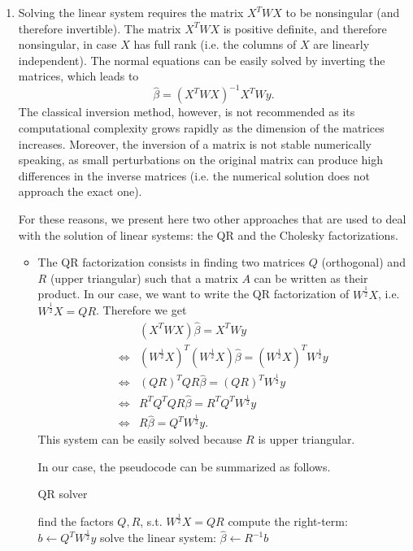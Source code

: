 \documentclass{homework}
\begin{document}
\begin{enumerate}[label=(\Alph*)]
\item Solving the linear system requires the matrix $X^T W X$ to be nonsingular (and therefore invertible). The matrix $X^T W X$ is positive definite, and therefore nonsingular, in case $X$ has full rank (i.e. the columns of $X$ are linearly independent). The normal equations can be easily solved by inverting the matrices, which leads to
$$\hat{\beta} = (X^T W X)^{-1} X^T W y.$$
The classical inversion method, however, is not recommended as its computational complexity grows rapidly as the dimension of the matrices increases. Moreover, the inversion of a matrix is not stable numerically speaking, as small perturbations on the original matrix can produce high differences in the inverse matrices (i.e. the numerical solution does not approach the exact one).

For these reasons, we present here two other approaches that are used to deal with the solution of linear systems: the QR and the Cholesky factorizations. 
\begin{itemize}
\item The QR factorization consists in finding two matrices $Q$ (orthogonal) and $R$ (upper triangular) such that a matrix $A$ can be written as their product. In our case, we want to write the QR factorization of $W^{\frac{1}{2}}X$, i.e. $W^{\frac{1}{2}}X = QR$. Therefore we get 
\begin{align*}
&(X^T W X) \hat{\beta} = X^T W y 
\\
\Leftrightarrow & (W^\frac{1}{2} X)^T (W^\frac{1}{2} X) \hat{\beta} = (W^\frac{1}{2} X)^T W^\frac{1}{2} y
\\
\Leftrightarrow & (QR)^T QR \hat{\beta} = (QR)^T W^\frac{1}{2} y
\\
\Leftrightarrow & R^T Q^T Q R \hat{\beta} = R^T Q^T W^\frac{1}{2} y
\\
\Leftrightarrow & R \hat{\beta} = Q^T W^\frac{1}{2} y.
\end{align*}
This system can be easily solved because $R$ is upper triangular.

In our case, the pseudocode can be summarized as follows.
\begin{algorithm}
\caption{QR solver}\label{alg:qr}
\begin{algorithmic}[1]
\State find the factors $Q, R$, s.t. $W^\frac{1}{2} X = QR$
\State compute the right-term: $b \gets Q^T W^{\frac{1}{2}} y$
\State solve the linear system: $\hat{\beta} \gets R^{-1} b$
\EndProcedure
\end{algorithmic}
\end{algorithm}


\end{itemize}
\end{enumerate}
\end{document}

